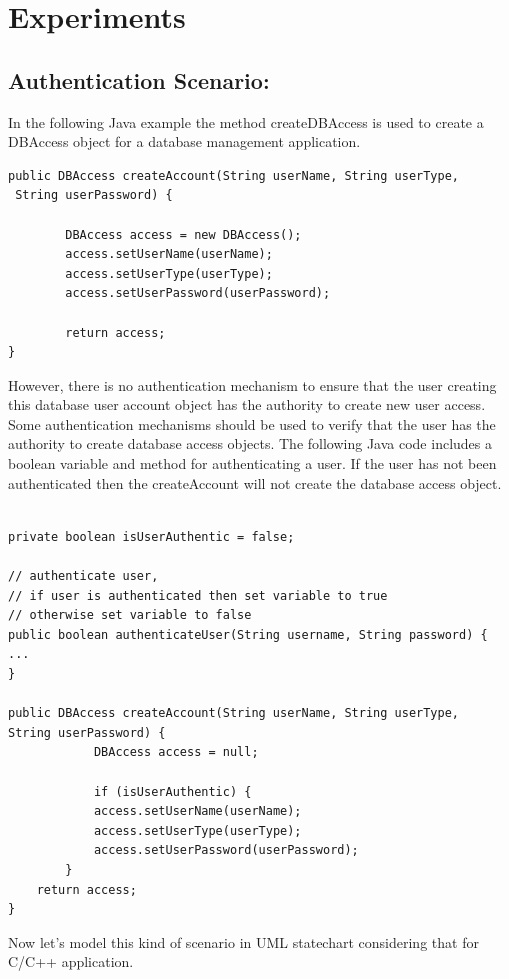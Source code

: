 \chapter{Experiments}
\section{Authentication Scenario:}

In the following Java example the method createDBAccess is used to create a DBAccess object for a database management application.

\begin{lstlisting}
public DBAccess createAccount(String userName, String userType,
 String userPassword) {

		DBAccess access = new DBAccess();
		access.setUserName(userName);
		access.setUserType(userType);
		access.setUserPassword(userPassword);	
				
		return access;
}

\end{lstlisting}

However, there is no authentication mechanism to ensure that the user creating this database user account object has the authority to create new user access. Some authentication mechanisms should be used to verify that the user has the authority to create database access objects.
The following Java code includes a boolean variable and method for authenticating a user. If the user has not been authenticated then the createAccount will not create the database access object.

\begin{lstlisting}

private boolean isUserAuthentic = false;

// authenticate user,
// if user is authenticated then set variable to true
// otherwise set variable to false
public boolean authenticateUser(String username, String password) {
...
}

public DBAccess createAccount(String userName, String userType,
String userPassword) {
			DBAccess access = null;
			
			if (isUserAuthentic) {
			access.setUserName(userName);
			access.setUserType(userType);
			access.setUserPassword(userPassword);
		}
	return access;
}
\end{lstlisting}

Now let's model this kind of scenario in UML statechart considering that for C/C++ application.

